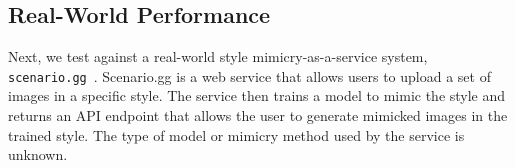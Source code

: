 \begin{table}[t]
  \centering
  \vspace{-0.1in}
  \caption{Performance of \system{} against real-world mimicry service
    (scenario.gg). Mimicry service achieves high mimicry success when no
    protection is used. When \system{} is used, the mimicry service has low
    performance. }
  \label{tab:real-world}
\end{table}

\secspace
\subsection{Real-World Performance}

Next, we test \system{} against a real-world style mimicry-as-a-service
system, \texttt{scenario.gg}~\cite{aigame}. Scenario.gg is a web service that
allows users to upload a set of images in a specific style. The
service then trains a model to mimic the style and returns an API endpoint
that allows the user to generate mimicked images in the trained style. The
type of model or mimicry method used by the service is unknown.

